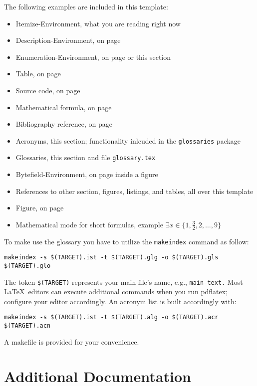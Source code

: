 The following examples are included in this template:
\begin{itemize}
    \item Itemize-Environment, what you are reading right now
	\item Description-Environment, on page \pageref{example:description}
	\item Enumeration-Environment, on page \pageref{example:enumeration} or this section
	\item Table, on page \pageref{tab:table}
	\item Source code, on page \pageref{lst:useless}
	\item Mathematical formula, on page \pageref{eqn:formula}
	\item Bibliography reference, on page \pageref{example:reference}
	\item Acronyms, this section; functionality inlcuded in the \texttt{glossaries} package
	\item Glossaries, this section and file \texttt{glossary.tex}
	\item Bytefield-Environment, on page \pageref{fig:bytefield} inside a figure
	\item References to other section, figures, listings, and tables, all over this template
	\item Figure, on page \pageref{fig:smiley}
	\item Mathematical mode for short formulas, example $\exists x \in \{1,\frac{3}{2},2,\ldots,9\}$
\end{itemize}

To make use the glossary you have to utilize the \texttt{makeindex} command as follow:
\begin{verbatim}
makeindex -s $(TARGET).ist -t $(TARGET).glg -o $(TARGET).gls $(TARGET).glo
\end{verbatim}
The token \texttt{\$(TARGET)} represents your main file's name, e.g., \texttt{main-text.}
Most \LaTeX\ editors can execute additional commands when you run \gls{pdflatex}; configure your editor accordingly.
An acronym list is built accordingly with:
\begin{verbatim}
makeindex -s $(TARGET).ist -t $(TARGET).alg -o $(TARGET).acr $(TARGET).acn
\end{verbatim}
A makefile is provided for your convenience.

\newpage
\section{Additional Documentation}

